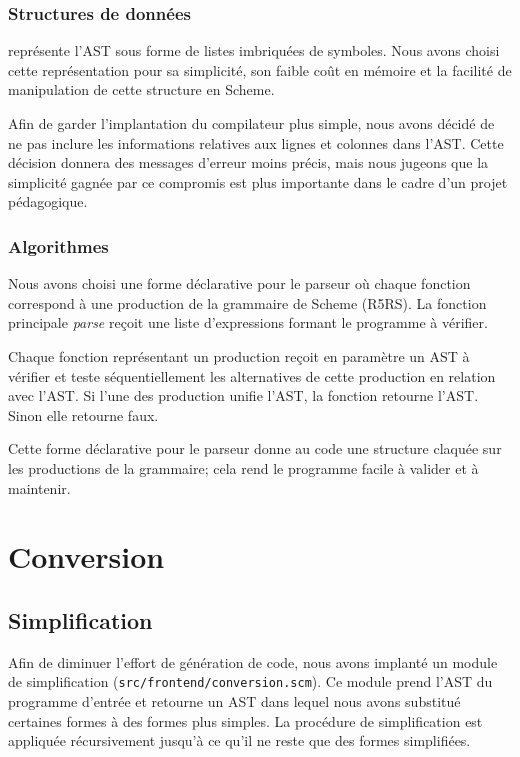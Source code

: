 \documentclass[11pt]{report}
\begin{document}
\subsection{Structures de données}

\sins{} représente l'AST sous forme de listes imbriquées de symboles. Nous
avons choisi cette représentation pour sa simplicité, son faible coût en
mémoire et la facilité de manipulation de cette structure en Scheme.

Afin de garder l'implantation du compilateur plus simple, nous avons
décidé de ne pas inclure les informations relatives aux lignes et
colonnes dans l'AST. Cette décision donnera des messages d'erreur
moins précis, mais nous jugeons que la simplicité gagnée par ce
compromis est plus importante dans le cadre d'un projet pédagogique.

\subsection{Algorithmes}

Nous avons choisi une forme déclarative pour le parseur où chaque fonction
correspond à une production de la grammaire de Scheme (R5RS). La fonction
principale \emph{parse} reçoit une liste d'expressions formant le programme à
vérifier.

Chaque fonction représentant un production reçoit en paramètre un AST à
vérifier et teste séquentiellement les alternatives de cette production en
relation avec l'AST. Si l'une des production unifie l'AST, la fonction retourne
l'AST. Sinon elle retourne faux.

Cette forme déclarative pour le parseur donne au code une structure
claquée sur les productions de la grammaire; cela rend le programme
facile à valider et à maintenir.


\chapter{Conversion}

\section{Simplification}

Afin de diminuer l'effort de génération de code, nous avons implanté
un module de simplification ({\tt src/frontend/conversion.scm}). Ce
module prend l'AST du programme d'entrée et retourne un AST dans
lequel nous avons substitué certaines formes à des formes plus
simples. La procédure de simplification est appliquée récursivement
jusqu'à ce qu'il ne reste que des formes simplifiées.
\end{document}
